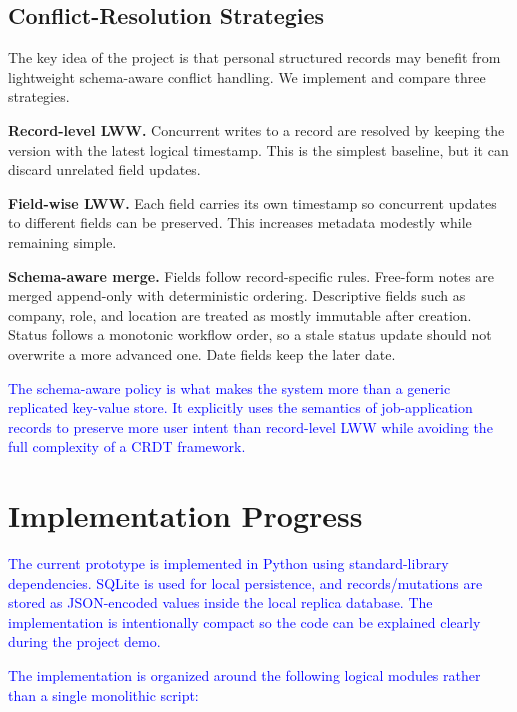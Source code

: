 \documentclass[10pt,twocolumn]{article}
\newcommand{\update}[1]{\textcolor{blue}{#1}}
\begin{document}
\subsection{Conflict-Resolution Strategies}

The key idea of the project is that personal structured records may benefit from lightweight schema-aware conflict handling. We implement and compare three strategies.

\textbf{Record-level LWW.} Concurrent writes to a record are resolved by keeping the version with the latest logical timestamp. This is the simplest baseline, but it can discard unrelated field updates.

\textbf{Field-wise LWW.} Each field carries its own timestamp so concurrent updates to different fields can be preserved. This increases metadata modestly while remaining simple.

\textbf{Schema-aware merge.} Fields follow record-specific rules. Free-form notes are merged append-only with deterministic ordering. Descriptive fields such as company, role, and location are treated as mostly immutable after creation. Status follows a monotonic workflow order, so a stale status update should not overwrite a more advanced one. Date fields keep the later date.

\update{The schema-aware policy is what makes the system more than a generic replicated key-value store. It explicitly uses the semantics of job-application records to preserve more user intent than record-level LWW while avoiding the full complexity of a CRDT framework.}

\section{Implementation Progress}

\update{The current prototype is implemented in Python using standard-library dependencies. SQLite is used for local persistence, and records/mutations are stored as JSON-encoded values inside the local replica database. The implementation is intentionally compact so the code can be explained clearly during the project demo.}

\update{The implementation is organized around the following logical modules rather than a single monolithic script:}
\end{document}
